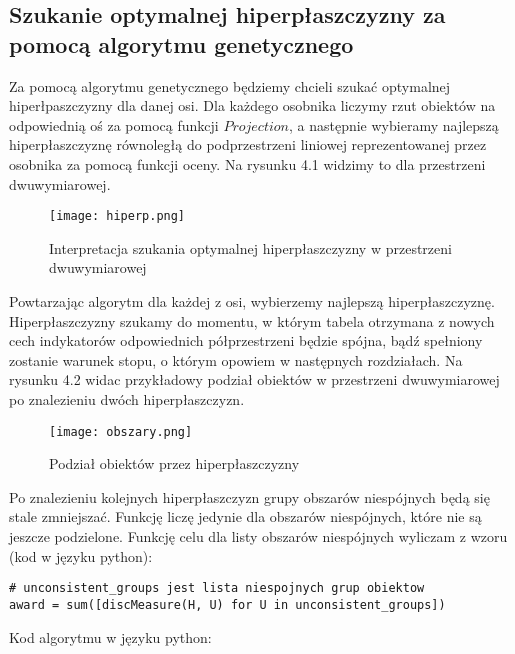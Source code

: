 \documentclass[magisterska]{pracamgr}
\theoremstyle{plain}
\theoremstyle{definition}
\theoremstyle{remark}
\begin{document}
\subsection{Szukanie optymalnej hiperpłaszczyzny za pomocą algorytmu genetycznego}
Za pomocą algorytmu genetycznego będziemy chcieli szukać optymalnej hiperłpaszczyzny dla danej osi. Dla każdego osobnika liczymy rzut obiektów na 
odpowiednią oś za pomocą funkcji $Projection$, a następnie wybieramy najlepszą hiperpłaszczyznę równoległą do podprzestrzeni liniowej 
reprezentowanej przez osobnika za pomocą funkcji oceny. Na rysunku 4.1 widzimy to dla przestrzeni dwuwymiarowej.
\begin{figure}
 \caption{Interpretacja szukania optymalnej hiperpłaszczyzny w przestrzeni dwuwymiarowej}
 \texttt{[image: hiperp.png]}
\end{figure}
Powtarzając algorytm dla każdej z osi,
wybierzemy najlepszą hiperpłaszczyznę. Hiperpłaszczyzny szukamy do momentu, w którym tabela otrzymana z nowych cech indykatorów odpowiednich 
półprzestrzeni będzie spójna, bądź spełniony zostanie warunek stopu, o którym opowiem w następnych rozdziałach. Na rysunku 4.2 widac 
przykładowy podział obiektów
w przestrzeni dwuwymiarowej po znalezieniu dwóch hiperpłaszczyzn.
\begin{figure}
 \caption{Podział obiektów przez hiperpłaszczyzny}
 \texttt{[image: obszary.png]}
\end{figure}
Po znalezieniu kolejnych hiperpłaszczyzn grupy obszarów niespójnych będą się stale zmniejszać. Funkcję liczę jedynie dla obszarów
niespójnych, które nie są jeszcze podzielone. Funkcję celu dla listy obszarów niespójnych wyliczam z wzoru (kod w języku python):
\begin{lstlisting}
# unconsistent_groups jest lista niespojnych grup obiektow
award = sum([discMeasure(H, U) for U in unconsistent_groups])
\end{lstlisting}
Kod algorytmu w języku python:
\end{document}
